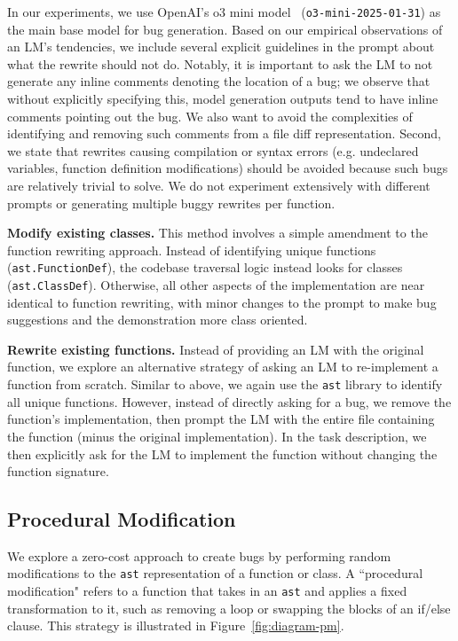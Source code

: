 

In our experiments, we use OpenAI's o3 mini model~\citep{openai2024o3card} (\texttt{o3-mini-2025-01-31}) as the main base model for bug generation.
Based on our empirical observations of an LM's tendencies, we include several explicit guidelines in the prompt about what the rewrite should not do.
Notably, it is important to ask the LM to not generate any inline comments denoting the location of a bug; we observe that without explicitly specifying this, model generation outputs tend to have inline comments pointing out the bug.
We also want to avoid the complexities of identifying and removing such comments from a file diff representation.
Second, we state that rewrites causing compilation or syntax errors (e.g. undeclared variables, function definition modifications) should be avoided because such bugs are relatively trivial to solve.
We do not experiment extensively with different prompts or generating multiple buggy rewrites per function.

\textbf{Modify existing classes.}
This method involves a simple amendment to the function rewriting approach.
Instead of identifying unique functions (\texttt{ast.FunctionDef}), the codebase traversal logic instead looks for classes (\texttt{ast.ClassDef}).
Otherwise, all other aspects of the implementation are near identical to function rewriting, with minor changes to the prompt to make bug suggestions and the demonstration more class oriented.

\textbf{Rewrite existing functions.}
Instead of providing an LM with the original function, we explore an alternative strategy of asking an LM to re-implement a function from scratch.
Similar to above, we again use the \texttt{ast} library to identify all unique functions.
However, instead of directly asking for a bug, we remove the function's implementation, then prompt the LM with the entire file containing the function (minus the original implementation).
In the task description, we then explicitly ask for the LM to implement the function without changing the function signature.

\subsection{Procedural Modification}
\label{appx:bugs:generate:prod}
We explore a zero-cost approach to create bugs by performing random modifications to the \texttt{ast} representation of a function or class.
A ``procedural modification" refers to a function that takes in an \texttt{ast} and applies a fixed transformation to it, such as removing a loop or swapping the blocks of an if/else clause.
This strategy is illustrated in Figure~\ref{fig:diagram-pm}.


